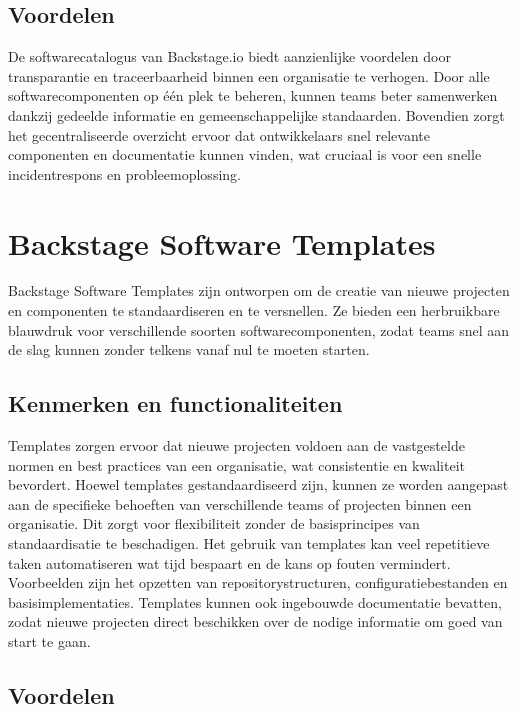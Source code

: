 \subsection{Voordelen}

De softwarecatalogus van Backstage.io biedt aanzienlijke voordelen door transparantie en traceerbaarheid binnen een organisatie te verhogen. Door alle softwarecomponenten op één plek te beheren, kunnen teams beter samenwerken dankzij gedeelde informatie en gemeenschappelijke standaarden. Bovendien zorgt het gecentraliseerde overzicht ervoor dat ontwikkelaars snel relevante componenten en documentatie kunnen vinden, wat cruciaal is voor een snelle incidentrespons en probleemoplossing.

\section{Backstage Software Templates}

Backstage Software Templates zijn ontworpen om de creatie van nieuwe projecten en componenten te standaardiseren en te versnellen. Ze bieden een herbruikbare blauwdruk voor verschillende soorten softwarecomponenten, zodat teams snel aan de slag kunnen zonder telkens vanaf nul te moeten starten.

\subsection{Kenmerken en functionaliteiten}

Templates zorgen ervoor dat nieuwe projecten voldoen aan de vastgestelde normen en best practices van een organisatie, wat consistentie en kwaliteit bevordert. Hoewel templates gestandaardiseerd zijn, kunnen ze worden aangepast aan de specifieke behoeften van verschillende teams of projecten binnen een organisatie. Dit zorgt voor flexibiliteit zonder de basisprincipes van standaardisatie te beschadigen. Het gebruik van templates kan veel repetitieve taken automatiseren wat tijd bespaart en de kans op fouten vermindert. Voorbeelden zijn het opzetten van repositorystructuren, configuratiebestanden en basisimplementaties. Templates kunnen ook ingebouwde documentatie bevatten, zodat nieuwe projecten direct beschikken over de nodige informatie om goed van start te gaan.

\subsection{Voordelen}

